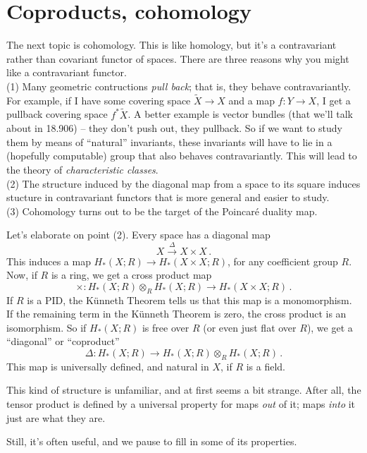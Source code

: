 \section{Coproducts, cohomology}

The next topic is cohomology. This is like homology, but it's a
contravariant rather than covariant functor of spaces. There are three reasons
why you might like a contravariant functor. \\
(1) Many geometric contructions {\em pull back}; that is, they behave
contravariantly.
For example, if I have some covering space $\widetilde{X}\to X$ and a map $f:Y\to X$, I get a pullback covering space $f^{\ast}\widetilde{X}$. A better example is vector bundles (that we'll talk about in 18.906) -- they don't push out, they pullback. 
 So if we want to study them by means of ``natural''
invariants, these invariants will have to lie in a (hopefully computable)
group that also behaves contravariantly. 
This will lead to the theory of \emph{characteristic classes}.\\
(2) The structure induced by the diagonal map from a space to its square
induces stucture in contravariant functors that is more general and easier
to study. \\
(3)  Cohomology turns out to be the target of the Poincar\'{e} duality map.

Let's elaborate on point (2). Every space has a diagonal map 
\[
X\xrightarrow{\Delta}X\times X\,.
\]
This induces a map $ H_\ast(X;R)\to H_\ast(X\times X;R)$, for any coefficient
group $R$. Now, if $R$ is a ring, we get a cross product map 
\[
\times:H_\ast(X;R)\otimes_R H_\ast(X;R)\to H_\ast(X\times X;R)\,.
\]
If $R$ is a PID, the K\"unneth Theorem tells us that this map is
a monomorphism. If the remaining term in the K\"unneth Theorem is zero, 
the cross product
is an isomorphism. So if $H_*(X;R)$ is free over $R$ (or even just flat over
$R$), we get a ``diagonal'' or ``coproduct''
\[
\Delta:H_\ast(X;R)\to H_\ast(X;R)\otimes_R H_\ast(X;R)\,.
\]
This map is universally defined, and natural in $X$, if $R$ is a field. 

This kind of structure is unfamiliar, and at first seems a bit strange.
After all, the tensor product is defined by a universal property for maps
{\em out} of it; maps {\em into} it just are what they are.

Still, it's often useful, and we pause to fill in some of its properties.

